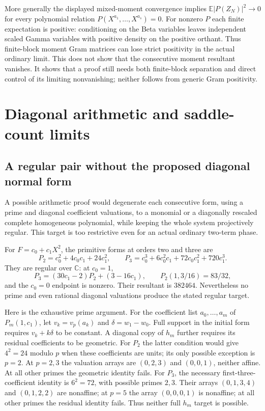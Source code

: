 \documentclass[11pt]{article}
\begin{document}
More generally the displayed mixed-moment convergence implies
$\mathbb E|P(Z_N)|^2\to0$ for every polynomial relation
$P(X^{a_1},\ldots,X^{a_s})=0$.  For nonzero $P$ each finite expectation
is positive: conditioning on the Beta variables leaves independent
scaled Gamma variables with positive density on the positive orthant.
Thus finite-block moment Gram matrices can lose strict positivity
in the actual ordinary limit.  This does not show that the consecutive
moment resultant vanishes.  It shows that a proof still needs both
finite-block separation and direct control of its limiting
nonvanishing; neither follows from generic Gram positivity.


\section{Diagonal arithmetic and saddle-count limits}
\subsection{A regular pair without the proposed diagonal normal form}
A possible arithmetic proof would degenerate each consecutive form,
using a prime and diagonal coefficient valuations, to a monomial or a
diagonally rescaled complete homogeneous polynomial, while keeping the
whole system projectively regular.  This target is too restrictive even
for an actual ordinary two-term phase.

For $F=c_0+c_1X^2$, the primitive forms at orders two and three are
\[
 P_2=c_0^2+4c_0c_1+24c_1^2,\qquad
 P_3=c_0^3+6c_0^2c_1+72c_0c_1^2+720c_1^3.
\]
They are regular over $\mathbb C$: at $c_0=1$,
\[
 P_3=(30c_1-2)P_2+(3-16c_1),\qquad
 P_2(1,3/16)=83/32,
\]
and the $c_0=0$ endpoint is nonzero. Their resultant is $382464$.
Nevertheless no prime and even rational diagonal valuations produce
the stated regular target.

Here is the exhaustive prime argument. For the coefficient list
$a_0,\ldots,a_m$ of $P_m(1,c_1)$, let $v_k=v_p(a_k)$ and
$\delta=w_1-w_0$. Full support in the initial form requires $v_k+k\delta$
to be constant. A diagonal copy of $h_m$ further requires its residual
coefficients to be geometric. For $P_2$ the latter condition would give
$4^2=24$ modulo $p$ when these coefficients are units; its only possible
exception is $p=2$. At $p=2,3$ the valuation arrays are
$(0,2,3)$ and $(0,0,1)$, neither affine. At all other primes the
geometric identity fails. For $P_3$, the necessary first-three-coefficient
identity is $6^2=72$, with possible primes $2,3$.
Their arrays $(0,1,3,4)$ and $(0,1,2,2)$ are nonaffine;
at $p=5$ the array $(0,0,0,1)$ is nonaffine; at all other primes
the residual identity fails. Thus neither full $h_m$ target is possible.
\end{document}
